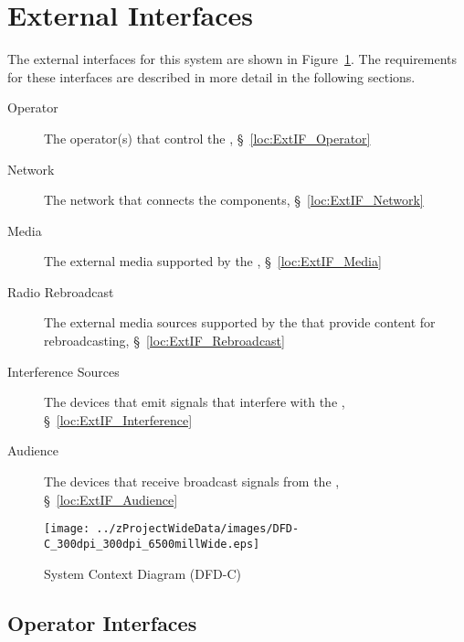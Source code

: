 \newpage
\section{External Interfaces}
\label{loc:ExternalInterfaces}


The external interfaces for this system are shown in Figure~\ref{fig:DFD-C}.
The requirements for these interfaces are described in more detail in the following sections.
\begin{description}
	\item[Operator] The operator(s) that control the \ThisSys, \S~\ref{loc:ExtIF_Operator}
	\item[Network] The network that connects the \ThisSys components, \S~\ref{loc:ExtIF_Network}
	\item[Media] The external media supported by the \ThisSys, \S~\ref{loc:ExtIF_Media}
	\item[Radio Rebroadcast] The external media sources supported by the \ThisSys that provide content for rebroadcasting, \S~\ref{loc:ExtIF_Rebroadcast}
	\item[Interference Sources] The devices that emit signals that interfere with the \ThisSys, \S~\ref{loc:ExtIF_Interference}
	\item[Audience] The devices that receive broadcast signals from the \ThisSys, \S~\ref{loc:ExtIF_Audience}
\end{description}
\begin{figure}[htbp]
	\centering
		\texttt{[image: ../zProjectWideData/images/DFD-C\_300dpi\_300dpi\_6500millWide.eps]}
	\caption[System Context Diagram]{System Context Diagram (DFD-C)}
	\label{fig:DFD-C}
\end{figure}

\KNEADSUBSECTIONNEWPAGE
\subsection{Operator Interfaces}
\label{loc:ExtIF_Operator}



\KNEADSUBSECTIONNEWPAGE
